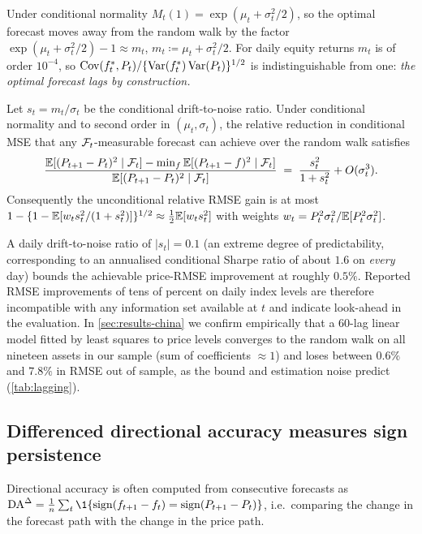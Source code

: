 \noindent Under conditional normality $M_t(1)=\exp(\mu_t+\sigma_t^2/2)$, so the optimal forecast
moves away from the random walk by the factor $\exp(\mu_t+\sigma_t^2/2)-1\approx m_t$,
$m_t\coloneqq\mu_t+\sigma_t^2/2$. For daily equity returns $m_t$ is of order $10^{-4}$, so
$\operatorname{Cov}(f^\ast_t,P_t)/\{\operatorname{Var}(f^\ast_t)\operatorname{Var}(P_t)\}^{1/2}$ is indistinguishable from one: \emph{the
optimal forecast lags by construction.}

\begin{proposition}\label{prop:bound}
Let $s_t=m_t/\sigma_t$ be the conditional drift-to-noise ratio. Under conditional normality and
to second order in $(\mu_t,\sigma_t)$, the relative reduction in conditional MSE that any
$\mathcal{F}_t$-measurable forecast can achieve over the random walk satisfies
\begin{equation}\label{eq:bound}
  \frac{\mathbb{E}[(P_{t+1}-P_t)^2\mid\mathcal{F}_t]-\min_f\mathbb{E}[(P_{t+1}-f)^2\mid\mathcal{F}_t]}{\mathbb{E}[(P_{t+1}-P_t)^2\mid\mathcal{F}_t]}
  \;=\;\frac{s_t^2}{1+s_t^2}+O(\sigma_t^3).
\end{equation}
Consequently the unconditional relative RMSE gain is at most
$1-\{1-\mathbb{E}[w_t s_t^2/(1+s_t^2)]\}^{1/2}\approx \tfrac12\mathbb{E}[w_t s_t^2]$ with weights
$w_t=P_t^2\sigma_t^2/\mathbb{E}[P_t^2\sigma_t^2]$.
\end{proposition}

\noindent A daily drift-to-noise ratio of $|s_t|=0.1$ (an extreme degree of predictability,
corresponding to an annualised conditional Sharpe ratio of about $1.6$ on \emph{every} day) bounds
the achievable price-RMSE improvement at roughly $0.5\%$. Reported RMSE improvements of tens of
percent on daily index levels are therefore incompatible with any information set available at
$t$ and indicate look-ahead in the evaluation. In \cref{sec:results-china} we confirm empirically that a
60-lag linear model fitted by least squares to price levels converges to the random walk on all
nineteen assets in our sample (sum of coefficients $\approx 1$) and loses between $0.6\%$ and
$7.8\%$ in RMSE out of sample, as the bound and estimation noise predict
(\cref{tab:lagging}).

\subsection{Differenced directional accuracy measures sign persistence}

Directional accuracy is often computed from consecutive forecasts as
$\mathrm{DA}^{\Delta}=\frac1n\sum_t\1\{\operatorname{sign}(f_{t+1}-f_{t})=\operatorname{sign}(P_{t+1}-P_t)\}$,
i.e.\ comparing the change in the forecast path with the change in the price path.

